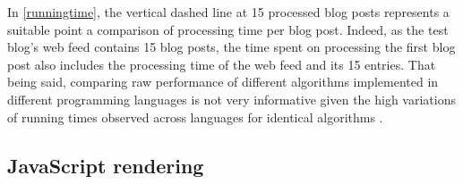 In \autoref{runningtime}, the vertical dashed line at 15 processed blog posts represents a suitable point a comparison of processing time per blog post. Indeed, as the test blog's web feed contains 15 blog posts, the time spent on processing the first blog post also includes the processing time of the web feed and its 15 entries. That being said, comparing raw performance of different algorithms implemented in different programming languages is not very informative given the high variations of running times observed across languages for identical algorithms \cite{hundt2011}.



\subsection{JavaScript rendering}





